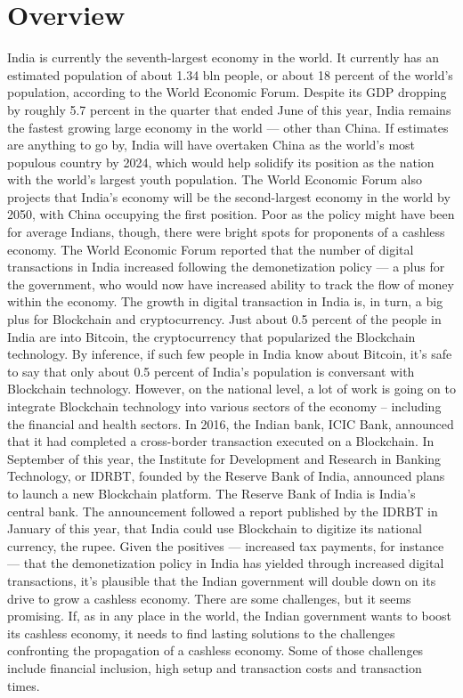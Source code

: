 \documentclass[oneside,a4paper,12pt]{report}
\begin{document}
\section{Overview}
India is currently the seventh-largest economy in the world. It currently has an estimated population of about 1.34 bln people, or about 18 percent of the world’s population, according to the World Economic Forum. Despite its GDP dropping by roughly 5.7 percent in the quarter that ended June of this year, India remains the fastest growing large economy in the world — other than China. If estimates are anything to go by, India will have overtaken China as the world’s most populous country by 2024, which would help solidify its position as the nation with the world’s largest youth population. The World Economic Forum also projects that India’s economy will be the second-largest economy in the world by 2050, with China occupying the first position. Poor as the policy might have been for average Indians, though, there were bright spots for proponents of a cashless economy. The World Economic Forum reported that the number of digital transactions in India increased following the demonetization policy — a plus for the government, who would now have increased ability to track the flow of money within the economy. The growth in digital transaction in India is, in turn, a big plus for Blockchain and cryptocurrency. Just about 0.5 percent of the people in India are into Bitcoin, the cryptocurrency that popularized the Blockchain technology. By inference, if such few people in India know about Bitcoin, it’s safe to say that only about 0.5 percent of India’s population is conversant with Blockchain technology. However, on the national level, a lot of work is going on to integrate Blockchain technology into various sectors of the economy – including the financial and health sectors. In 2016, the Indian bank, ICIC Bank, announced that it had completed a cross-border transaction executed on a Blockchain. In September of this year, the Institute for Development and Research in Banking Technology, or IDRBT, founded by the Reserve Bank of India, announced plans to launch a new Blockchain platform. The Reserve Bank of India is India’s central bank. The announcement followed a report published by the IDRBT in January of this year, that India could use Blockchain to digitize its national currency, the rupee. Given the positives — increased tax payments, for instance — that the demonetization policy in India has yielded through increased digital transactions, it’s plausible that the Indian government will double down on its drive to grow a cashless economy. There are some challenges, but it seems promising. If, as in any place in the world, the Indian government wants to boost its cashless economy, it needs to find lasting solutions to the challenges confronting the propagation of a cashless economy. Some of those challenges include financial inclusion, high setup and transaction costs and transaction times. 
 
\end{document}
